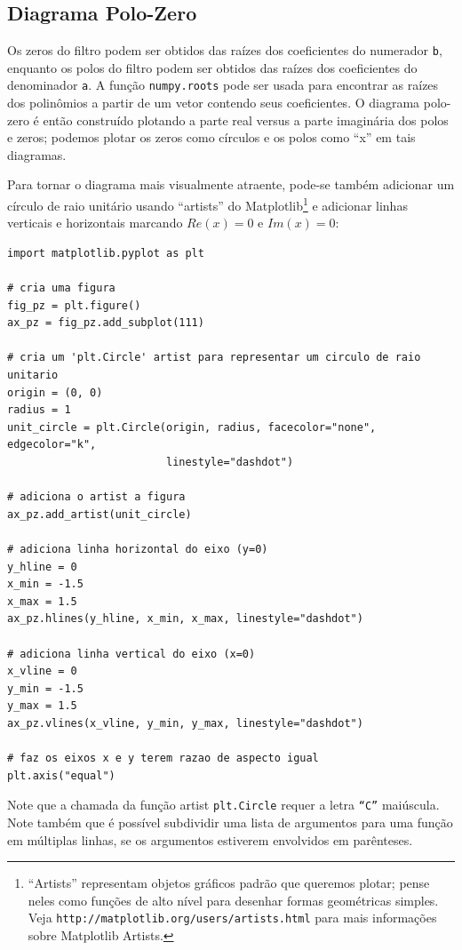 \documentclass[a4paper,twoside,12pt]{article}
\begin{document}
	\subsection{Diagrama Polo-Zero}
	
	Os zeros do filtro podem ser obtidos das raízes dos coeficientes do numerador {\tt b}, enquanto os polos do filtro podem ser obtidos das raízes dos coeficientes do denominador {\tt a}. A função {\tt numpy.roots} pode ser usada para encontrar as raízes dos polinômios a partir de um vetor contendo seus coeficientes. O diagrama polo-zero é então construído plotando a parte real versus a parte imaginária dos polos e zeros; podemos plotar os zeros como círculos e os polos como ``x'' em tais diagramas.
	
	Para tornar o diagrama mais visualmente atraente, pode-se também adicionar um círculo de raio unitário usando ``artists'' do Matplotlib\footnote{``Artists'' representam objetos gráficos padrão que queremos plotar; pense neles como funções de alto nível para desenhar formas geométricas simples. Veja {\tt http://matplotlib.org/users/artists.html} para mais informações sobre Matplotlib Artists.} e adicionar linhas verticais e horizontais marcando $Re(x) = 0$ e $Im(x) = 0$:
	
	\begin{lstlisting}[frame=single]
import matplotlib.pyplot as plt

# cria uma figura
fig_pz = plt.figure()
ax_pz = fig_pz.add_subplot(111)

# cria um 'plt.Circle' artist para representar um circulo de raio unitario
origin = (0, 0)
radius = 1
unit_circle = plt.Circle(origin, radius, facecolor="none", edgecolor="k",
                         linestyle="dashdot")

# adiciona o artist a figura
ax_pz.add_artist(unit_circle)

# adiciona linha horizontal do eixo (y=0)
y_hline = 0
x_min = -1.5
x_max = 1.5
ax_pz.hlines(y_hline, x_min, x_max, linestyle="dashdot")

# adiciona linha vertical do eixo (x=0)
x_vline = 0
y_min = -1.5
y_max = 1.5
ax_pz.vlines(x_vline, y_min, y_max, linestyle="dashdot")

# faz os eixos x e y terem razao de aspecto igual
plt.axis("equal")
	\end{lstlisting}
	
	Note que a chamada da função artist {\tt plt.Circle} requer a letra {\tt ``C''} maiúscula. Note também que é possível subdividir uma lista de argumentos para uma função em múltiplas linhas, se os argumentos estiverem envolvidos em parênteses.
	
\end{document}
